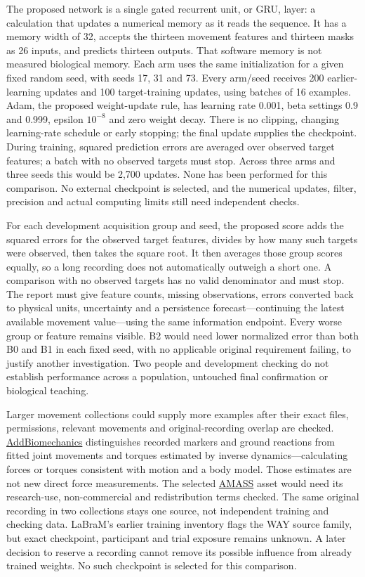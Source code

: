 The proposed network is a single gated recurrent unit, or GRU, layer: a calculation that updates a numerical memory as it reads the sequence. It has a memory width of 32, accepts the thirteen movement features and thirteen masks as 26 inputs, and predicts thirteen outputs. That software memory is not measured biological memory. Each arm uses the same initialization for a given fixed random seed, with seeds 17, 31 and 73. Every arm/seed receives 200 earlier-learning updates and 100 target-training updates, using batches of 16 examples. Adam, the proposed weight-update rule, has learning rate 0.001, beta settings 0.9 and 0.999, epsilon $10^{-8}$ and zero weight decay. There is no clipping, changing learning-rate schedule or early stopping; the final update supplies the checkpoint. During training, squared prediction errors are averaged over observed target features; a batch with no observed targets must stop. Across three arms and three seeds this would be 2,700 updates. None has been performed for this comparison. No external checkpoint is selected, and the numerical updates, filter, precision and actual computing limits still need independent checks.

For each development acquisition group and seed, the proposed score adds the squared errors for the observed target features, divides by how many such targets were observed, then takes the square root. It then averages those group scores equally, so a long recording does not automatically outweigh a short one. A comparison with no observed targets has no valid denominator and must stop. The report must give feature counts, missing observations, errors converted back to physical units, uncertainty and a persistence forecast---continuing the latest available movement value---using the same information endpoint. Every worse group or feature remains visible. B2 would need lower normalized error than both B0 and B1 in each fixed seed, with no applicable original requirement failing, to justify another investigation. Two people and development checking do not establish performance across a population, untouched final confirmation or biological teaching.

Larger movement collections could supply more examples after their exact files, permissions, relevant movements and original-recording overlap are checked. \href{https://www.addbiomechanics.org/download_data.html}{AddBiomechanics} distinguishes recorded markers and ground reactions from fitted joint movements and torques estimated by inverse dynamics---calculating forces or torques consistent with motion and a body model. Those estimates are not new direct force measurements. The selected \href{https://amass.is.tue.mpg.de/license.html}{AMASS} asset would need its research-use, non-commercial and redistribution terms checked. The same original recording in two collections stays one source, not independent training and checking data. LaBraM's earlier training inventory flags the WAY source family, but exact checkpoint, participant and trial exposure remains unknown. A later decision to reserve a recording cannot remove its possible influence from already trained weights. No such checkpoint is selected for this comparison.

